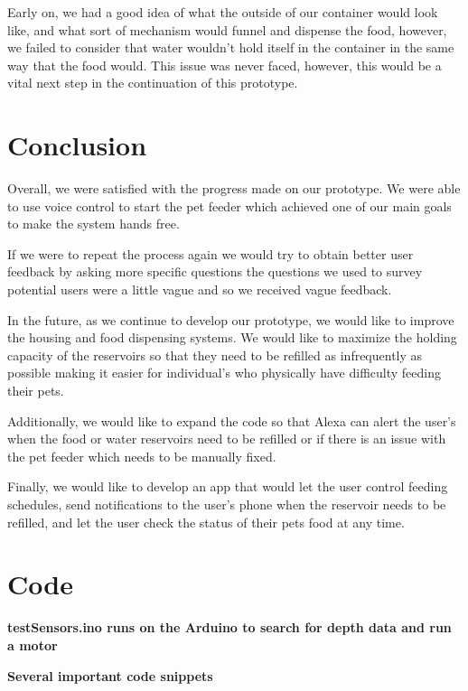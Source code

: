 \documentclass[notitlepage,11pt]{article}
\begin{document}
        Early on, we had a good idea of what the outside of our container would look like, and what sort of mechanism 
        would funnel and dispense the food, however, we failed to consider that water wouldn't hold itself in the 
        container in the same way that the food would. This issue was never faced, however, this would be a vital next 
        step in the continuation of this prototype. 

    \section{Conclusion}
        Overall, we were satisfied with the progress made on our prototype. We were able to use voice control to start 
        the pet feeder which achieved one of our main goals to make the system hands free. 

        If we were to repeat the process again we would try to obtain better user feedback by asking more specific 
        questions the questions we used to survey potential users were a little vague and so we received vague feedback.

        In the future, as we continue to develop our prototype, we would like to improve the housing and food dispensing 
        systems. We would like to maximize the holding capacity of the reservoirs so that they need to be refilled as 
        infrequently as possible making it easier for individual's who physically have difficulty feeding their pets.

        Additionally, we would like to expand the code so that Alexa can alert the user's when the food or water 
        reservoirs need to be refilled or if there is an issue with the pet feeder which needs to be manually fixed.

        Finally, we would like to develop an app that would let the user control feeding schedules, send notifications 
        to the user's phone when the reservoir needs to be refilled, and let the user check the status of their pets 
        food at any time.

    \newpage

    \section{Code}
        \textbf{testSensors.ino runs on the Arduino to search for depth data and run a motor}

        \textbf{Several important code snippets}
\end{document}
